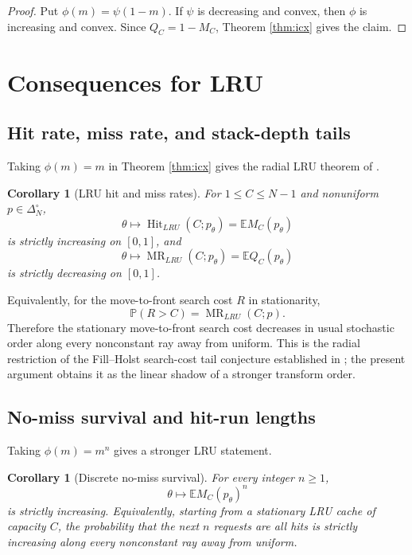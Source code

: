 \documentclass[11pt]{article}
\newtheorem{corollary}[theorem]{Corollary}
\newcommand{\E}{\mathbb E}
\newcommand{\Pbb}{\mathbb P}
\newcommand{\1}{\mathbf 1}
\newcommand{\MR}{\operatorname{MR}}
\newcommand{\Hit}{\operatorname{Hit}}
\begin{document}
\begin{proof}
Put $\phi(m)=\psi(1-m)$.  If $\psi$ is decreasing and convex, then $\phi$ is increasing
and convex.  Since $Q_C=1-M_C$, Theorem \ref{thm:icx} gives the claim.
\end{proof}

\section{Consequences for LRU}

\subsection{Hit rate, miss rate, and stack-depth tails}

Taking $\phi(m)=m$ in Theorem \ref{thm:icx} gives the radial LRU theorem of
\cite{LongLRU2026}.

\begin{corollary}[LRU hit and miss rates]\label{cor:lru-hit-miss}
For $1\le C\le N-1$ and nonuniform $p\in\Delta_N^\circ$,
\[
        \theta\mapsto \Hit_{LRU}(C;p_\theta)=\E M_C(p_\theta)
\]
is strictly increasing on $[0,1]$, and
\[
        \theta\mapsto \MR_{LRU}(C;p_\theta)=\E Q_C(p_\theta)
\]
is strictly decreasing on $[0,1]$.
\end{corollary}

Equivalently, for the move-to-front search cost $R$ in stationarity,
\[
        \Pbb(R>C)=\MR_{LRU}(C;p).
\]
Therefore the stationary move-to-front search cost decreases in usual stochastic order
along every nonconstant ray away from uniform.  This is the radial restriction of the
Fill--Holst search-cost tail conjecture established in \cite{LongLRU2026}; the present
argument obtains it as the linear shadow of a stronger transform order.

\subsection{No-miss survival and hit-run lengths}

Taking $\phi(m)=m^n$ gives a stronger LRU statement.

\begin{corollary}[Discrete no-miss survival]\label{cor:no-miss-discrete}
For every integer $n\ge1$,
\[
        \theta\mapsto \E M_C(p_\theta)^n
\]
is strictly increasing.  Equivalently, starting from a stationary LRU cache of capacity
$C$, the probability that the next $n$ requests are all hits is strictly increasing along
every nonconstant ray away from uniform.
\end{corollary}
\end{document}
